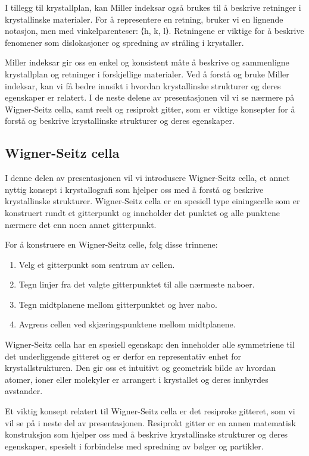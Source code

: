 I tillegg til krystallplan, kan Miller indeksar også brukes til å beskrive retninger i krystallinske materialer. For å representere en retning, bruker vi en lignende notasjon, men med vinkelparenteser: ⟨h, k, l⟩. Retningene er viktige for å beskrive fenomener som dislokasjoner og spredning av stråling i krystaller.

Miller indeksar gir oss en enkel og konsistent måte å beskrive og sammenligne krystallplan og retninger i forskjellige materialer. Ved å forstå og bruke Miller indeksar, kan vi få bedre innsikt i hvordan krystallinske strukturer og deres egenskaper er relatert. I de neste delene av presentasjonen vil vi se nærmere på Wigner-Seitz cella, samt reelt og resiprokt gitter, som er viktige konsepter for å forstå og beskrive krystallinske strukturer og deres egenskaper.

\subsection*{Wigner-Seitz cella}

I denne delen av presentasjonen vil vi introdusere Wigner-Seitz cella, et annet nyttig konsept i krystallografi som hjelper oss med å forstå og beskrive krystallinske strukturer. Wigner-Seitz cella er en spesiell type einingscelle som er konstruert rundt et gitterpunkt og inneholder det punktet og alle punktene nærmere det enn noen annet gitterpunkt.

For å konstruere en Wigner-Seitz celle, følg disse trinnene:

\begin{enumerate}
    \item Velg et gitterpunkt som sentrum av cellen.
    \item Tegn linjer fra det valgte gitterpunktet til alle nærmeste naboer.
    \item Tegn midtplanene mellom gitterpunktet og hver nabo.
    \item Avgrens cellen ved skjæringspunktene mellom midtplanene.
\end{enumerate}

Wigner-Seitz cella har en spesiell egenskap: den inneholder alle symmetriene til det underliggende gitteret og er derfor en representativ enhet for krystallstrukturen. Den gir oss et intuitivt og geometrisk bilde av hvordan atomer, ioner eller molekyler er arrangert i krystallet og deres innbyrdes avstander.

Et viktig konsept relatert til Wigner-Seitz cella er det resiproke gitteret, som vi vil se på i neste del av presentasjonen. Resiprokt gitter er en annen matematisk konstruksjon som hjelper oss med å beskrive krystallinske strukturer og deres egenskaper, spesielt i forbindelse med spredning av bølger og partikler.

